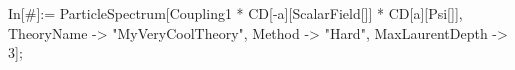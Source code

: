 In[#]:= ParticleSpectrum[Coupling1 * CD[-a][ScalarField[]] * CD[a][Psi[]], TheoryName -> "MyVeryCoolTheory", Method -> "Hard", MaxLaurentDepth -> 3]; 